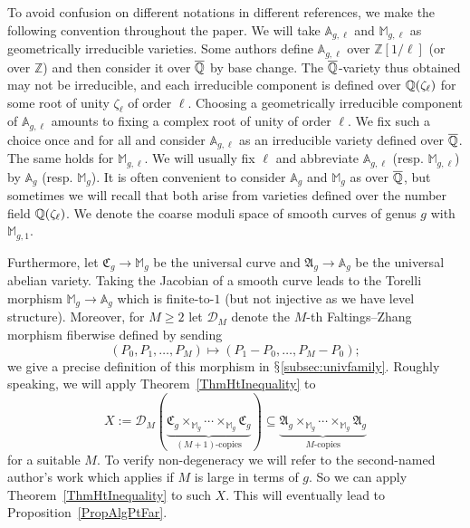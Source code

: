 To avoid confusion on different notations in different references, we
make the following convention throughout  the paper. We will take
$\mathbb{A}_{g,\ell}$ and $\mathbb{M}_{g,\ell}$ as geometrically
irreducible varieties. 
 Some authors define
$\mathbb{A}_{g,\ell}$ over $\mathbb{Z}[1/\ell]$ (or over $\mathbb{Z}$)
and then consider it over ${\overline{\mathbb{Q}}}$ by base change. The
${\overline{\mathbb{Q}}}$-variety thus obtained may not be irreducible, and each
irreducible component is defined over ${\mathbb{Q}}(\zeta_{\ell})$ for some
 root of unity $\zeta_{\ell}$ of order $\ell$.
Choosing a geometrically irreducible component of $\mathbb{A}_{g,\ell}$
amounts to fixing a complex root of unity of order $\ell$.
We fix such a choice once and for all and consider
$\mathbb{A}_{g,\ell}$ as an irreducible variety defined over ${\overline{\mathbb{Q}}}$.
The same  holds
for $\mathbb{M}_{g,\ell}$.
We will usually fix $\ell$ and abbreviate $\mathbb{A}_{g,\ell}$ (resp.
$\mathbb{M}_{g,\ell}$) by $\mathbb{A}_g$ (resp. $\mathbb{M}_g$).
It is often convenient to consider $\mathbb{A}_g$ and $\mathbb{M}_g$
as over ${\overline{\mathbb{Q}}}$, but sometimes we will recall that both arise from
varieties defined over the number field ${\mathbb{Q}}(\zeta_\ell)$.
We denote the coarse moduli space of smooth curves of genus $g$
with $\mathbb{M}_{g,1}$.

Furthermore, let
$\mathfrak{C}_g \rightarrow \mathbb{M}_g$ be the universal curve and
$\mathfrak{A}_g \rightarrow \mathbb A_g$ be the universal abelian
variety. Taking the Jacobian of a smooth curve leads to the  Torelli morphism
$\mathbb{M}_g \rightarrow \mathbb A_g$ which is finite-to-$1$  (but
 not injective  as we
have level structure).
Moreover, for $M\ge 2$ let
$\mathscr{D}_M$ denote the $M$-th Faltings--Zhang morphism fiberwise defined by
sending
\begin{equation}
  \label{eq:faltingszhangintro}
  (P_0, P_1, \ldots, P_M) \mapsto (P_1-P_0, \ldots, P_M-P_0);
\end{equation}
we give a precise definition of this morphism
in $\mathsection$\ref{subsec:univfamily}. 
Roughly speaking, we will  apply Theorem~\ref{ThmHtInequality} to
\[
  X := \mathscr{D}_M(\underbrace{\mathfrak{C}_g \times_{\mathbb{M}_g} \cdots \times_{\mathbb{M}_g} \mathfrak{C}_g}_{(M+1)\text{-copies}}) \subseteq \underbrace{\mathfrak{A}_g \times_{\mathbb M_g} \cdots \times_{\mathbb M_g} \mathfrak{A}_g}_{M\text{-copies}}
\]
for
a suitable  $M$. To verify non-degeneracy we will refer to  
the second-named author's work \cite[Theorem~1.2']{GaoBettiRank} which
applies if $M$ is large in terms of $g$.  So we can apply Theorem~\ref{ThmHtInequality} to such $X$.  This
will eventually lead to Proposition~\ref{PropAlgPtFar}. %

